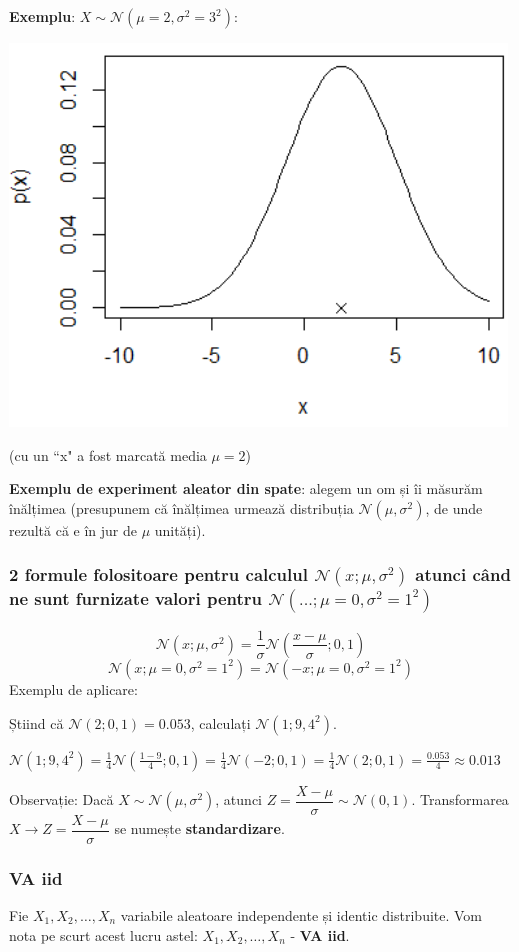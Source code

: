 \documentclass[12pt]{article}
\begin{document}
\begin{itemize}
		\textbf{Exemplu}: $X \sim \mathcal{N}(\mu=2,\sigma^2=3^2)$:
		
		\begin{center}
			\includegraphics[width=0.75\linewidth]{screenshot001}
			
			(cu un ``x" a fost marcată media $\mu = 2$)
		\end{center}

		\textbf{Exemplu de experiment aleator din spate}: alegem un om și îi măsurăm înălțimea (presupunem că înălțimea urmează distribuția $\mathcal{N}(\mu,\sigma^2)$, de unde rezultă că e în jur de $\mu$ unități).
	\end{itemize}
	
	\subsubsection{2 formule folositoare pentru calculul $\mathcal{N}(x;\mu,\sigma^2)$ atunci când ne sunt furnizate valori pentru $\mathcal{N}(...;\mu=0,\sigma^2=1^2)$}
	$$\mathcal{N}(x;\mu,\sigma^2)=\frac{1}{\sigma}\mathcal{N}\left(\frac{x-\mu}{\sigma};0,1\right)$$
	$$\mathcal{N}(x;\mu=0,\sigma^2=1^2) = \mathcal{N}(-x;\mu=0,\sigma^2=1^2)$$
	Exemplu de aplicare:
	
	Știind că $\mathcal{N}(2;0,1)=0.053$, calculați $\mathcal{N}(1;9,4^2)$.
	
	$\mathcal{N}(1;9,4^2) = \frac{1}{4} \mathcal{N}(\frac{1-9}{4};0,1) = \frac{1}{4}\mathcal{N}(-2;0,1) = \frac{1}{4}\mathcal{N}(2;0,1) = \frac{0.053}{4} \approx 0.013$
	
	\noindent Observație: Dacă $X \sim \mathcal{N}(\mu,\sigma^2)$, atunci $Z=\dfrac{X-\mu}{\sigma} \sim \mathcal{N}(0,1)$. Transformarea $X\rightarrow Z = \dfrac{X-\mu}{\sigma}$ se numește \textbf{standardizare}.
	
	\subsubsection{VA iid}
	Fie $X_1, X_2, \dots, X_n$ variabile aleatoare independente și identic distribuite. Vom nota pe scurt acest lucru astel: $X_1, X_2, \dots, X_n$ - \textbf{VA iid}.
	
\end{document}
